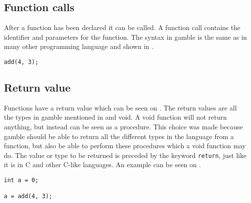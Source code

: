 \subsection*{Function calls}
After a function has been declared it can be called. 
A function call contains the identifier and parameters for the function. 
The syntax in \gls{gamble} is the same as in many other programming language and shown in . 

\begin{lstlisting}[caption={A function call in \gls{gamble}},label={lst:functionCall},numbers=none]
add(4, 3);
\end{lstlisting}


\subsection*{Return value}
Functions have a return value which can be seen on .
The return values are all the types in \gls{gamble} mentioned in  and void. 
A void function will not return anything, but instead can be seen as a procedure.
This choice was made because \gls{gamble} should be able to return all the different types in the language from a function, but also be able to perform these procedures which a void function may do.
The value or type to be returned is preceded by the keyword \texttt{return}, just like it is in C and other C-like languages.
An example can be seen on .

\begin{lstlisting}[caption={Return Function},label={lst:returnFunction}]
int a = 0;

a = add(4, 3);
\end{lstlisting}


 

